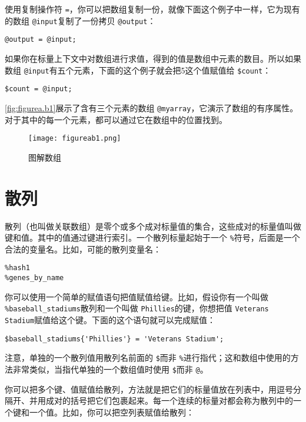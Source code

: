 使用复制操作符 \verb|=|，你可以把数组复制一份，就像下面这个例子中一样，它为现有的数组 \verb|@input|复制了一份拷贝 \verb|@output|：

\begin{lstlisting}
@output = @input;
\end{lstlisting}

如果你在标量上下文中对数组进行求值，得到的值是数组中元素的数目。所以如果数组 \verb|@input|有五个元素，下面的这个例子就会把5这个值赋值给 \verb|$count|：

\begin{lstlisting}
$count = @input;
\end{lstlisting}

\autoref{fig:figurea.b1}展示了含有三个元素的数组 \verb|@myarray|，它演示了数组的有序属性。对于其中的每一个元素，都可以通过它在数组中的位置找到。

\begin{figure}
  \centering
  \texttt{[image: figureab1.png]}
  \caption{图解数组}
  \label{fig:figurea.b1}
 \end{figure}{}

\section{散列}
散列（也叫做关联数组）是零个或多个成对标量值的集合，这些成对的标量值叫做键和值。其中的值通过键进行索引。一个散列标量起始于一个 \verb|%|符号，后面是一个合法的变量名。比如，可能的散列变量名：

\begin{lstlisting}
%hash1
%genes_by_name
\end{lstlisting}

你可以使用一个简单的赋值语句把值赋值给键。比如，假设你有一个叫做 \verb|%baseball_stadiums|散列和一个叫做 \verb|Phillies|的键，你想把值 \verb|Veterans Stadium|赋值给这个键。下面的这个语句就可以完成赋值：

\begin{lstlisting}
$baseball_stadiums{'Phillies'} = 'Veterans Stadium';
\end{lstlisting}

注意，单独的一个散列值用散列名前面的 \verb|$|而非 \verb|%|进行指代；这和数组中使用的方法非常类似，当指代单独的一个数组值时使用 \verb|$|而非 \verb|@|。

你可以把多个键、值赋值给散列，方法就是把它们的标量值放在列表中，用逗号分隔开、并用成对的括号把它们包裹起来。每一个连续的标量对都会称为散列中的一个键和一个值。比如，你可以把空列表赋值给散列：

